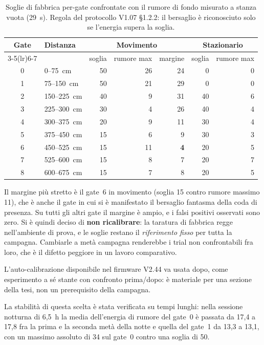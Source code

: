 \begin{table}[htbp]
\centering
\caption{Soglie di fabbrica per-gate confrontate con il rumore di fondo misurato a
stanza vuota (29~s). Regola del protocollo V1.07 \S1.2.2: il bersaglio è
riconosciuto solo se l'energia supera la soglia.}
\label{tab:soglie}
\small
\begin{tabular}{@{}clrrrrr@{}}
\toprule
\textbf{Gate} & \textbf{Distanza} & \multicolumn{3}{c}{\textbf{Movimento}} &
\multicolumn{2}{c}{\textbf{Stazionario}} \\
\cmidrule(lr){3-5}\cmidrule(lr){6-7}
 & & soglia & rumore max & margine & soglia & rumore max \\
\midrule
0 & 0--75~cm    & 50 & 26 & 24 & 0  & 0 \\
1 & 75--150~cm  & 50 & 21 & 29 & 0  & 0 \\
2 & 150--225~cm & 40 & 9  & 31 & 40 & 6 \\
3 & 225--300~cm & 30 & 4  & 26 & 40 & 4 \\
4 & 300--375~cm & 20 & 9  & 11 & 30 & 4 \\
5 & 375--450~cm & 15 & 6  & 9  & 30 & 3 \\
6 & 450--525~cm & 15 & 11 & \textbf{4} & 20 & 5 \\
7 & 525--600~cm & 15 & 8  & 7  & 20 & 7 \\
8 & 600--675~cm & 15 & 7  & 8  & 20 & 5 \\
\bottomrule
\end{tabular}
\end{table}

Il margine più stretto è il gate~6 in movimento (soglia 15 contro rumore massimo
11), che è anche il gate in cui si è manifestato il bersaglio fantasma della coda di
presenza. Su tutti gli altri gate il margine è ampio, e i falsi positivi osservati
sono zero. Si è quindi deciso di \textbf{non ricalibrare}: la taratura di fabbrica
regge nell'ambiente di prova, e le soglie restano il \emph{riferimento fisso} per
tutta la campagna. Cambiarle a metà campagna renderebbe i trial non confrontabili
fra loro, che è il difetto peggiore in un lavoro comparativo.

L'auto-calibrazione disponibile nel firmware V2.44 va usata dopo, come esperimento a
sé stante con confronto prima/dopo: è materiale per una sezione della tesi, non un
prerequisito della campagna.

La stabilità di questa scelta è stata verificata su tempi lunghi: nella sessione
notturna di 6,5~h la media dell'energia di rumore del gate~0 è passata da 17,4 a
17,8 fra la prima e la seconda metà della notte e quella del gate~1 da 13,3 a 13,1,
con un massimo assoluto di 34 sul gate~0 contro una soglia di 50.
